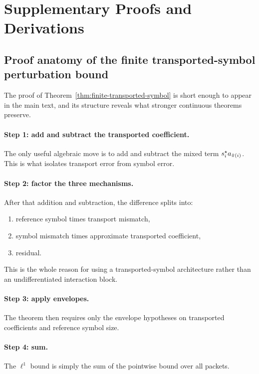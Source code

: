 \section{Supplementary Proofs and Derivations}
\label{app:proofs}

\subsection{Proof anatomy of the finite transported-symbol perturbation bound}

The proof of Theorem~\ref{thm:finite-transported-symbol} is short enough to appear in the main text, and its structure reveals what stronger continuous theorems preserve.

\paragraph{Step 1: add and subtract the transported coefficient.}
The only useful algebraic move is to add and subtract the mixed term $s^\star_i a_{\hat\pi(i)}$. This is what isolates transport error from symbol error.

\paragraph{Step 2: factor the three mechanisms.}
After that addition and subtraction, the difference splits into:
\begin{enumerate}
\item reference symbol times transport mismatch,
\item symbol mismatch times approximate transported coefficient,
\item residual.
\end{enumerate}
This is the whole reason for using a transported-symbol architecture rather than an undifferentiated interaction block.

\paragraph{Step 3: apply envelopes.}
The theorem then requires only the envelope hypotheses on transported coefficients and reference symbol size.

\paragraph{Step 4: sum.}
The $\ell^1$ bound is simply the sum of the pointwise bound over all packets.

